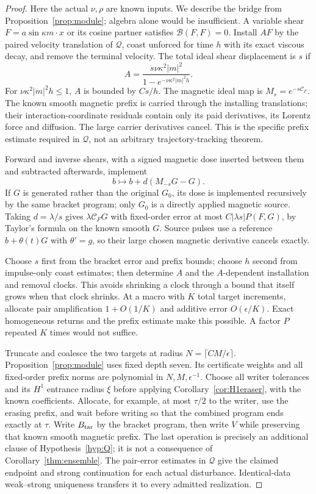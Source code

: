 \documentclass[11pt,a4paper]{amsart}
\theoremstyle{definition}
\theoremstyle{remark}
\numberwithin{equation}{section}
\newcommand{\Bcal}{\mathcal B}
\newcommand{\Ccal}{\mathcal C}
\newcommand{\Qcal}{\mathcal Q}
\begin{document}
\begin{proof}
Here the actual $\nu,\rho$ are known inputs. We describe the bridge from Proposition~\ref{prop:module}; algebra alone would be insufficient. A variable shear $F=a\sin\kappa m\cdot x$ or its cosine partner satisfies $\Bcal(F,F)=0$. Install $AF$ by the paired velocity translation of $\Qcal$, coast unforced for time $h$ with its exact viscous decay, and remove the terminal velocity. The total ideal shear displacement is $s$ if
\[
 A=\frac{s\nu\kappa^2|m|^2}{1-e^{-\nu\kappa^2|m|^2h}}.
\]
For $\nu\kappa^2|m|^2h\le1$, $A$ is bounded by $Cs/h$. The magnetic ideal map is $M_s=e^{-s\Ccal_F}$. The known smooth magnetic prefix is carried through the installing translations; their interaction-coordinate residuals contain only its paid derivatives, its Lorentz force and diffusion. The large carrier derivatives cancel. This is the specific prefix estimate required in $\Qcal$, not an arbitrary trajectory-tracking theorem.

Forward and inverse shears, with a signed magnetic dose inserted between them and subtracted afterwards, implement
\[
 b\longmapsto b+d(M_{-s}G-G).
\]
If $G$ is generated rather than the original $G_0$, its dose is implemented recursively by the same bracket program; only $G_0$ is a directly applied magnetic source. Taking $d=\lambda/s$ gives $\lambda\Ccal_FG$ with fixed-order error at most $C|\lambda s|P(F,G)$, by Taylor's formula on the known smooth $G$. Source pulses use a reference $b+\theta(t)G$ with $\theta'=g$, so their large chosen magnetic derivative cancels exactly.

Choose $s$ first from the bracket error and prefix bounds; choose $h$ second from impulse-only coast estimates; then determine $A$ and the $A$-dependent installation and removal clocks. This avoids shrinking a clock through a bound that itself grows when that clock shrinks. At a macro with $K$ total target increments, allocate pair amplification $1+O(1/K)$ and additive error $O(\epsilon/K)$. Exact homogeneous returns and the prefix estimate make this possible. A factor $P$ repeated $K$ times would not suffice.

Truncate and coalesce the two targets at radius $N=\lceil CM/\epsilon\rceil$. Proposition~\ref{prop:module} uses fixed depth seven. Its certificate weights and all fixed-order prefix norms are polynomial in $N,M,\epsilon^{-1}$. Choose all writer tolerances and its $H^1$ entrance radius $\xi$ before applying Corollary~\ref{cor:H1eraser}, with the known coefficients. Allocate, for example, at most $\tau/2$ to the writer, use the erasing prefix, and wait before writing so that the combined program ends exactly at $\tau$. Write $B_{\rm tar}$ by the bracket program, then write $V$ while preserving that known smooth magnetic prefix. The last operation is precisely an additional clause of Hypothesis~\ref{hyp:Q}; it is not a consequence of Corollary~\ref{thm:ensemble}. The pair-error estimates in $\Qcal$ give the claimed endpoint and strong continuation for each actual disturbance. Identical-data weak--strong uniqueness transfers it to every admitted realization.


\end{proof}
\end{document}
